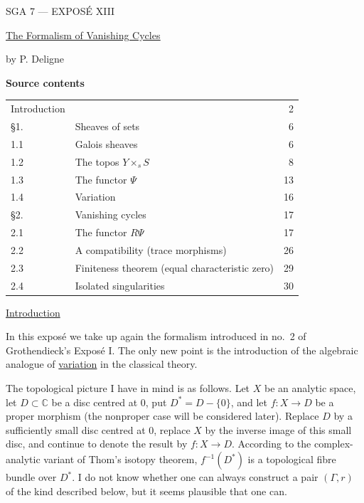 \clearpage
\begin{center}
{\large SGA 7 --- EXPOS\'E XIII}\par
\vspace{2em}
{\Large\underline{\underline{The Formalism of Vanishing Cycles}}}\par
\vspace{1.5em}
{\large by P. Deligne}
\end{center}

\medskip
\noindent\textbf{Source contents}
\begin{center}
\begin{tabular}{@{}llr@{}}
Introduction && 2\\
\S1. & Sheaves of sets & 6\\
1.1 & Galois sheaves & 6\\
1.2 & The topos $Y\times_s S$ & 8\\
1.3 & The functor $\Psi$ & 13\\
1.4 & Variation & 16\\
\S2. & Vanishing cycles & 17\\
2.1 & The functor $R\Psi$ & 17\\
2.2 & A compatibility (trace morphisms) & 26\\
2.3 & Finiteness theorem (equal characteristic zero) & 29\\
2.4 & Isolated singularities & 30
\end{tabular}
\end{center}


\medskip
\underline{Introduction}

In this expos\'e we take up again the formalism introduced in no.~2 of
Grothendieck's Expos\'e I.  The only new point is the introduction of the
algebraic analogue of \underline{variation} in the classical theory.

The topological picture I have in mind is as follows.  Let $X$ be an
analytic space, let $D\subset\mathbb C$ be a disc centred at $0$, put
$D^*=D-\{0\}$, and let $f:X\longrightarrow D$ be a proper morphism (the
nonproper case will be considered later).  Replace $D$ by a sufficiently
small disc centred at $0$, replace $X$ by the inverse image of this small
disc, and continue to denote the result by $f:X\longrightarrow D$.
According to the complex-analytic variant of Thom's isotopy theorem,
$f^{-1}(D^*)$ is a topological fibre bundle over $D^*$.  I do not know
whether one can always construct a pair $(\Gamma,r)$ of the kind
described below, but it seems plausible that one can.

